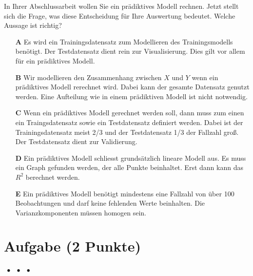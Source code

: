\documentclass[a4paper, 9pt]{scrartcl}\usepackage[]{graphicx}\usepackage[]{xcolor}
\begin{document}
In Ihrer Abschlussarbeit wollen Sie ein prädiktives Modell rechnen. Jetzt stellt sich die Frage, was diese Entscheidung für Ihre Auswertung bedeutet. Welche Aussage ist richtig?



\begin{enumerate}
\item [\textbf{A} \msquare] Es wird ein Trainingsdatensatz zum Modellieren des Trainingsmodells benötigt. Der Testdatensatz dient rein zur Visualisierung. Dies gilt vor allem für ein prädiktives Modell.
\item [\textbf{B} \msquare] Wir modellieren den Zusammenhang zwischen $X$ und $Y$ wenn ein prädiktives Modell rerechnet wird. Dabei kann der gesamte Datensatz genutzt werden. Eine Aufteilung wie in einem prädiktiven Modell ist nicht notwendig.
\item [\textbf{C} \msquare] Wenn ein prädiktives Modell gerechnet werden soll, dann muss zum einen ein Traingsdatensatz sowie ein Testdatensatz definiert werden. Dabei ist der Trainingsdatensatz meist 2/3 und der Testdatensatz 1/3 der Fallzahl groß. Der Testdatensatz dient zur Validierung.
\item [\textbf{D} \msquare] Ein prädiktives Modell schliesst grundsätzlich lineare Modell aus. Es muss ein Graph gefunden werden, der alle Punkte beinhaltet. Erst dann kann das $R^2$ berechnet werden.
\item [\textbf{E} \msquare] Ein prädiktives Modell benötigt mindestens eine Fallzahl von über 100 Beobachtungen und darf keine fehlenden Werte beinhalten. Die Varianzkomponenten müssen homogen sein.
\end{enumerate}

\section{Aufgabe \hfill (2 Punkte)}

\ifcollection
\begin{flushright}
\tiny\vspace{-2Ex}
\textbf{\examinhaltstart}
\exammodulestat $\;\bullet$
\exammodulestatbbv $\;\bullet$
\exammodulestatversuch $\;\bullet$
\exammodulebiostat
\vspace{-1Ex}
\end{flushright}
\fi
\end{document}
